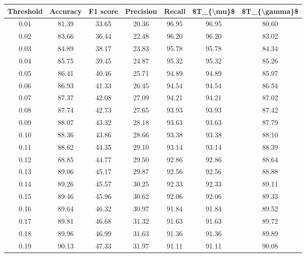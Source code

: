 \begin{tabular}{|c|c|c|c|c|c|c|}
\hline
 Threshold &  Accuracy &  F1 score &  Precision &  Recall &  \$T\_\{\textbackslash mu\}\$ &  \$T\_\{\textbackslash gamma\}\$ \\
\hline
      0.01 &     81.39 &     33.65 &      20.36 &   96.95 &      96.95 &         80.60 \\
      0.02 &     83.66 &     36.44 &      22.48 &   96.20 &      96.20 &         83.02 \\
      0.03 &     84.89 &     38.17 &      23.83 &   95.78 &      95.78 &         84.34 \\
      0.04 &     85.75 &     39.45 &      24.87 &   95.32 &      95.32 &         85.26 \\
      0.05 &     86.41 &     40.46 &      25.71 &   94.89 &      94.89 &         85.97 \\
      0.06 &     86.93 &     41.33 &      26.45 &   94.54 &      94.54 &         86.54 \\
      0.07 &     87.37 &     42.08 &      27.09 &   94.21 &      94.21 &         87.02 \\
      0.08 &     87.74 &     42.73 &      27.65 &   93.93 &      93.93 &         87.42 \\
      0.09 &     88.07 &     43.32 &      28.18 &   93.63 &      93.63 &         87.79 \\
      0.10 &     88.36 &     43.86 &      28.66 &   93.38 &      93.38 &         88.10 \\
      0.11 &     88.62 &     44.35 &      29.10 &   93.14 &      93.14 &         88.39 \\
      0.12 &     88.85 &     44.77 &      29.50 &   92.86 &      92.86 &         88.64 \\
      0.13 &     89.06 &     45.17 &      29.87 &   92.56 &      92.56 &         88.88 \\
      0.14 &     89.26 &     45.57 &      30.25 &   92.33 &      92.33 &         89.11 \\
      0.15 &     89.46 &     45.96 &      30.62 &   92.06 &      92.06 &         89.33 \\
      0.16 &     89.64 &     46.32 &      30.97 &   91.84 &      91.84 &         89.52 \\
      0.17 &     89.81 &     46.68 &      31.32 &   91.63 &      91.63 &         89.72 \\
      0.18 &     89.96 &     46.99 &      31.63 &   91.36 &      91.36 &         89.89 \\
      0.19 &     90.13 &     47.33 &      31.97 &   91.11 &      91.11 &         90.08 \\

\end{tabular}
